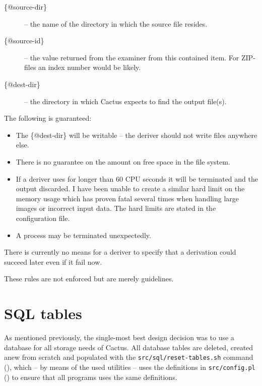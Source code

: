 \begin{description}

\item[\{@source-dir\}] -- the name of the directory in which the
source file resides.


\item[\{@source-id\}] -- the value returned from the examiner from
  this contained item.  For ZIP-files an index number would be likely.

\item[\{@dest-dir\}] -- the directory in which Cactus expects to find
  the output file(s).
\end{description}

The following is guaranteed:

\begin{itemize}

\item The \{@dest-dir\} will be writable -- the deriver should not
write files anywhere else.

\item There is no guarantee on the amount on free space in the file
system.

\item If a deriver uses for longer than 60 CPU seconds it will be
terminated and the output discarded.  I have been unable to create a
similar hard limit on the memory usage which has proven fatal several
times when handling large images or incorrect input data.  The hard
limits are stated in the configuration file.

\item A process may be terminated unexpectedly.
\end{itemize}

There is currently no means for a deriver to specify that a derivation
could succeed later even if it fail now.

These rules are not enforced but are merely guidelines.

\section{SQL tables}

As mentioned previously, the single-most best design decision was to
use a database for all storage needs of Cactus.  All database tables
are deleted, created anew from scratch and populated with the
\texttt{src/sql/reset-tables.sh} command
(), which -- by means of the used
utilities -- uses the definitions in \texttt{src/config.pl}
() to ensure that all programs uses the same
definitions.


